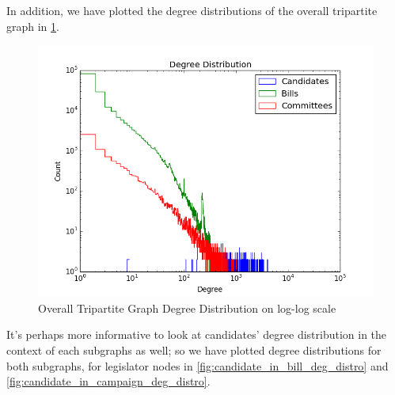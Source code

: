 \documentclass[12pt,twocolumn]{article}
\begin{document}
In addition, we have plotted the degree distributions of the overall tripartite graph in \ref{fig:overalldegdistro}. 
\begin{figure}
\centering
\includegraphics[width=0.5\linewidth]{overall_deg_distro}
\caption{Overall Tripartite Graph Degree Distribution on log-log scale}
\label{fig:overalldegdistro}
\end{figure}

It's perhaps more informative to look at candidates' degree distribution in the context of each subgraphs as well; so we have plotted degree distributions for both subgraphs, for legislator nodes in \ref{fig:candidate_in_bill_deg_distro} and \ref{fig:candidate_in_campaign_deg_distro}. 
\end{document}
